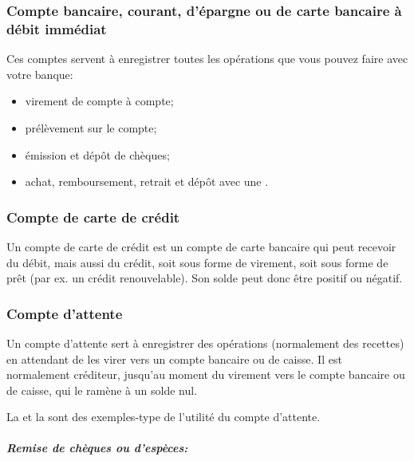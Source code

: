\subsubsection{Compte bancaire, courant, d'épargne ou de carte bancaire à débit immédiat\label{accounts-type-bank-misc}}

Ces comptes servent à enregistrer toutes les opérations que vous pouvez faire avec votre banque: 

\begin{itemize}
	\item virement de compte à compte;
	\item prélèvement sur le compte;
	\item émission et dépôt de chèques; 
	\item achat, remboursement, retrait et dépôt avec une . 
\end{itemize}


\subsubsection{Compte de carte de crédit\label{accounts-type-bank-creditcard}}

Un compte de carte de crédit est un compte de carte bancaire qui peut recevoir du débit, mais aussi du crédit, soit sous forme de virement, soit sous forme de prêt (par ex. un crédit renouvelable). Son solde peut donc être positif ou négatif.


\subsubsection{Compte d'attente\label{accounts-type-bank-waiting}}

Un compte d'attente sert à enregistrer des opérations (normalement des recettes) en attendant de les virer vers un compte bancaire ou de caisse. Il est normalement créditeur, jusqu'au moment du virement vers le compte bancaire ou de caisse, qui le ramène à un solde nul.

La  et la  sont des exemples-type de l'utilité du compte d'attente. 
 
\paragraph{\textsl{Remise de chèques ou d'espèces:}\label{accounts-type-bank-waiting-remittance}}


